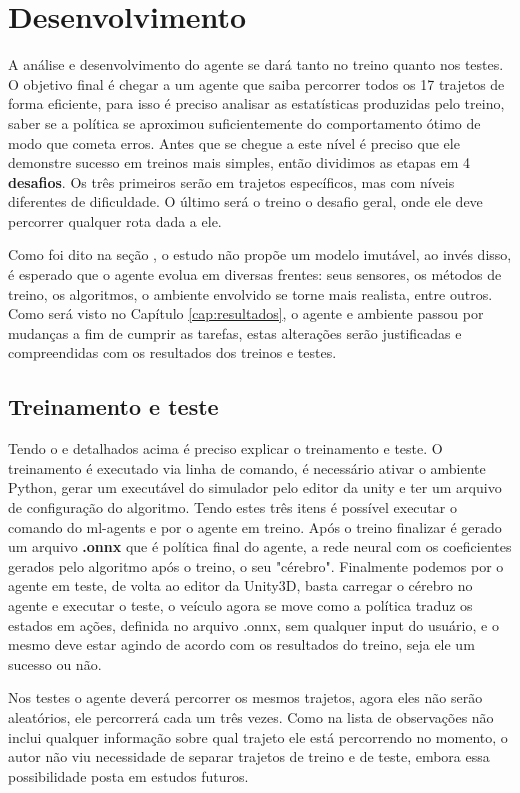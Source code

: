 \section{Desenvolvimento}\label{metodologia}
A análise e desenvolvimento do agente se dará tanto no treino quanto nos testes. O objetivo final é chegar a um agente que saiba percorrer todos os 17 trajetos de forma eficiente, para isso é preciso analisar as estatísticas produzidas pelo treino, saber se a política se aproximou suficientemente do comportamento ótimo de modo que cometa erros. Antes que se chegue a este nível é preciso que ele demonstre sucesso em treinos mais simples, então dividimos as etapas em 4 \textbf{desafios}. Os três primeiros serão em trajetos específicos, mas com níveis diferentes de dificuldade. O último será o treino o desafio geral, onde ele deve percorrer qualquer rota dada a ele.

Como foi dito na seção , o estudo não propõe um modelo imutável, ao invés disso, é esperado que o agente evolua em diversas frentes: seus sensores, os métodos de treino, os algoritmos, o ambiente envolvido se torne mais realista, entre outros. Como será visto no Capítulo \ref{cap:resultados}, o agente e ambiente passou por mudanças a fim de cumprir as tarefas, estas alterações serão justificadas e compreendidas com os resultados dos treinos e testes.

\subsection{Treinamento e teste}
Tendo o  e  detalhados acima é preciso explicar o treinamento e teste. O treinamento é executado via linha de comando, é necessário ativar o ambiente Python, gerar um executável do simulador pelo editor da unity e ter um arquivo de configuração do algoritmo. Tendo estes três itens é possível executar o comando do ml-agents e por o agente em treino. Após o treino finalizar é gerado um arquivo \textbf{.onnx} que é política final do agente, a rede neural com os coeficientes gerados pelo algoritmo após o treino, o seu "cérebro". Finalmente podemos por o agente em teste, de volta ao editor da Unity3D, basta carregar o cérebro no agente e executar o teste, o veículo agora se move como a política traduz os estados em ações, definida no arquivo .onnx, sem qualquer input do usuário, e o mesmo deve estar agindo de acordo com os resultados do treino, seja ele um sucesso ou não.

Nos testes o agente deverá percorrer os mesmos trajetos, agora eles não serão aleatórios, ele percorrerá cada um três vezes. Como na lista de observações não inclui qualquer informação sobre qual trajeto ele está percorrendo no momento, o autor não viu necessidade de separar trajetos de treino e de teste, embora essa possibilidade posta em estudos futuros.

